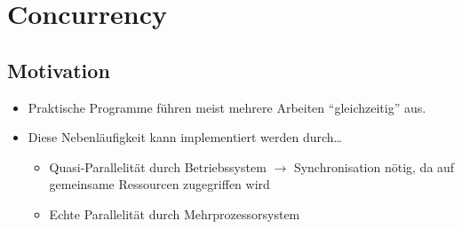 \section{Concurrency }
\subsection{Motivation}
\begin{itemize}
  \item Praktische Programme führen meist mehrere Arbeiten "`gleichzeitig"' aus. 
  \item Diese Nebenläufigkeit kann implementiert werden durch\ldots
  \begin{itemize}
    \item Quasi-Parallelität durch Betriebssystem $\rightarrow$ Synchronisation
    nötig, da auf gemeinsame Ressourcen zugegriffen wird
    \item Echte Parallelität durch Mehrprozessorsystem
  \end{itemize}
\end{itemize}


